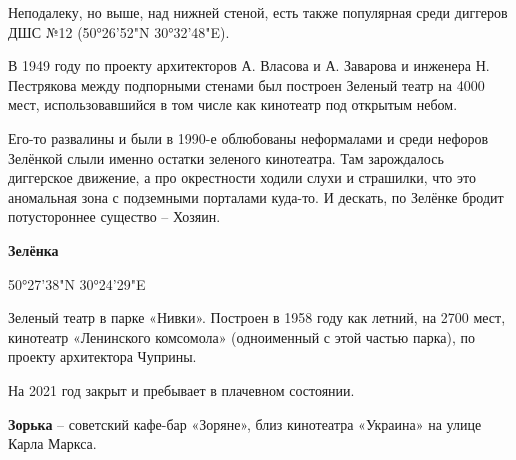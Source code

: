 Неподалеку, но выше, над нижней стеной, есть также популярная среди диггеров ДШС №12 (50°26'52"N 30°32'48"E).

В 1949 году по проекту архитекторов А. Власова и А. Заварова и инженера Н. Пестрякова между подпорными стенами был построен Зеленый театр на 4000 мест, использовавшийся в том числе как кинотеатр под открытым небом.

Его-то развалины и были в 1990-е облюбованы неформалами и среди нефоров Зелёнкой слыли именно остатки зеленого кинотеатра. Там зарождалось диггерское движение, а про окрестности ходили слухи и страшилки, что это аномальная зона с подземными порталами куда-то. И дескать, по Зелёнке бродит потустороннее существо – Хозяин.\\


\medskip

\textbf{Зелёнка}

50°27'38"N 30°24'29"E

Зеленый театр в парке «Нивки». Построен в 1958 году как летний, на 2700 мест, кинотеатр «Ленинского комсомола» (одноименный с этой частью парка), по проекту архитектора Чуприны.

На 2021 год закрыт и пребывает в плачевном состоянии.\\

\medskip

\textbf{Зорька} – советский кафе-бар «Зоряне», близ кинотеатра «Украина» на улице Карла Маркса.\\